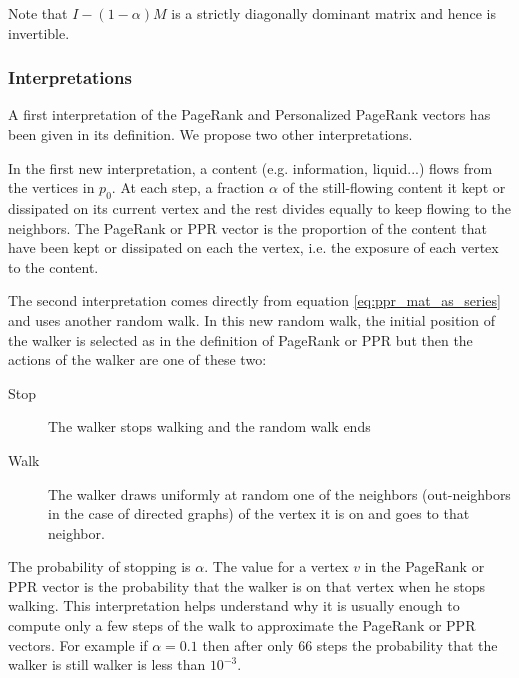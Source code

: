 Note that $I - (1-\alpha)M$ is a strictly diagonally dominant matrix and hence is invertible.

\subsubsection{Interpretations}
A first interpretation of the PageRank and Personalized PageRank vectors has been given in its definition. We propose two other interpretations.

In the first new interpretation, a content (e.g. information, liquid...) flows from the vertices in $p_0$. At each step, a fraction $\alpha$ of the still-flowing content it kept or dissipated on its current vertex and the rest divides equally to keep flowing to the neighbors. The PageRank or PPR vector is the proportion of the content that have been kept or dissipated on each the vertex, i.e. the exposure of each vertex to the content.

The second interpretation comes directly from equation \ref{eq:ppr_mat_as_series} and uses another random walk. In this new random walk, the initial position of the walker is selected as in the definition of PageRank or PPR but then the actions of the walker are one of these two:
\begin{description}
    \item[Stop] The walker stops walking and the random walk ends
    \item[Walk] The walker draws uniformly at random one of the neighbors (out-neighbors in the case of directed graphs) of the vertex it is on and goes to that neighbor.
\end{description}

The probability of stopping is $\alpha$. The value for a vertex $v$ in the PageRank or PPR vector is the probability that the walker is on that vertex when he stops walking. This interpretation helps understand why it is usually enough to compute only a few steps of the walk to approximate the PageRank or PPR vectors. For example if $\alpha = 0.1$ then after only $66$ steps the probability that the walker is still walker is less than $10^{-3}$.

